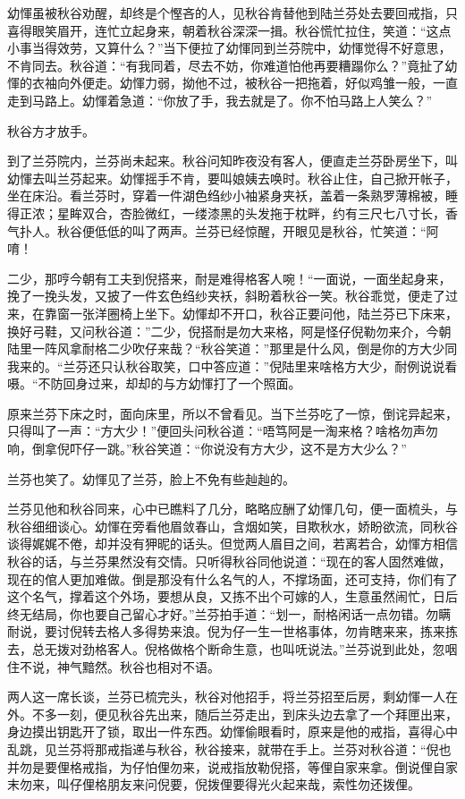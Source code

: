 \documentclass[12pt,UTF8]{ctexbook}
\begin{document}
{{{幼惲虽被秋谷劝醒，却终是个慳吝的人，见秋谷肯替他到陆兰芬处去要回戒指，只喜得眼笑眉开，连忙立起身来，朝着秋谷深深一揖。秋谷慌忙拉住，笑道：“这点小事当得效劳，又算什么？”当下便拉了幼惲同到兰芬院中，幼惲觉得不好意思，不肯同去。秋谷道：“有我同着，尽去不妨，你难道怕他再要糟蹋你么？”竟扯了幼惲的衣袖向外便走。幼惲力弱，拗他不过，被秋谷一把拖着，好似鸡雏一般，一直走到马路上。幼惲着急道：“你放了手，我去就是了。你不怕马路上人笑么？”

秋谷方才放手。

到了兰芬院内，兰芬尚未起来。秋谷问知昨夜没有客人，便直走兰芬卧房坐下，叫幼惲去叫兰芬起来。幼惲摇手不肯，要叫娘姨去唤时。秋谷止住，自己掀开帐子，坐在床沿。看兰芬时，穿着一件湖色绉纱小袖紧身夹袄，盖着一条熟罗薄棉被，睡得正浓；星眸双合，杏脸微红，一缕漆黑的头发拖于枕畔，约有三尺七八寸长，香气扑人。秋谷便低低的叫了两声。兰芬已经惊醒，开眼见是秋谷，忙笑道：“阿唷！

二少，那哼今朝有工夫到倪搭来，耐是难得格客人啘！“一面说，一面坐起身来，挽了一挽头发，又披了一件玄色绉纱夹袄，斜盼着秋谷一笑。秋谷乖觉，便走了过来，在靠窗一张洋圈椅上坐下。幼惲却不开口，秋谷正要问他，陆兰芬已下床来，换好弓鞋，又问秋谷道：”二少，倪搭耐是勿大来格，阿是怪仔倪勒勿来介，今朝陆里一阵风拿耐格二少吹仔来哉？“秋谷笑道：”那里是什么风，倒是你的方大少同我来的。“兰芬还只认秋谷取笑，口中答应道：”倪陆里来啥格方大少，耐例说说看嗫。“不防回身过来，却却的与方幼惲打了一个照面。

原来兰芬下床之时，面向床里，所以不曾看见。当下兰芬吃了一惊，倒诧异起来，只得叫了一声：“方大少！”便回头问秋谷道：“唔笃阿是一淘来格？啥格勿声勿响，倒拿倪吓仔一跳。”秋谷笑道：“你说没有方大少，这不是方大少么？”

兰芬也笑了。幼惲见了兰芬，脸上不免有些赸赸的。

兰芬见他和秋谷同来，心中已瞧料了几分，略略应酬了幼惲几句，便一面梳头，与秋谷细细谈心。幼惲在旁看他眉敛春山，含烟如笑，目欺秋水，娇盼欲流，同秋谷谈得娓娓不倦，却并没有狎昵的话头。但觉两人眉目之间，若离若合，幼惲方相信秋谷的话，与兰芬果然没有交情。只听得秋谷同他说道：“现在的客人固然难做，现在的倌人更加难做。倒是那没有什么名气的人，不撑场面，还可支持，你们有了这个名气，撑着这个外场，要想从良，又拣不出个可嫁的人，生意虽然闹忙，日后终无结局，你也要自己留心才好。”兰芬拍手道：“划一，耐格闲话一点勿错。勿瞒耐说，要讨倪转去格人多得势来浪。倪为仔一生一世格事体，勿肯瞎来来，拣来拣去，总无拨对劲格客人。倪格做格个断命生意，也叫呒说法。”兰芬说到此处，忽咽住不说，神气黯然。秋谷也相对不语。

两人这一席长谈，兰芬已梳完头，秋谷对他招手，将兰芬招至后房，剩幼惲一人在外。不多一刻，便见秋谷先出来，随后兰芬走出，到床头边去拿了一个拜匣出来，身边摸出钥匙开了锁，取出一件东西。幼惲偷眼看时，原来是他的戒指，喜得心中乱跳，见兰芬将那戒指递与秋谷，秋谷接来，就带在手上。兰芬对秋谷道：“倪也并勿是要俚格戒指，为仔怕俚勿来，说戒指放勒倪搭，等俚自家来拿。倒说俚自家末勿来，叫仔俚格朋友来问倪要，倪拨俚要得光火起来哉，索性勿还拨俚。

}}}
\end{document}

